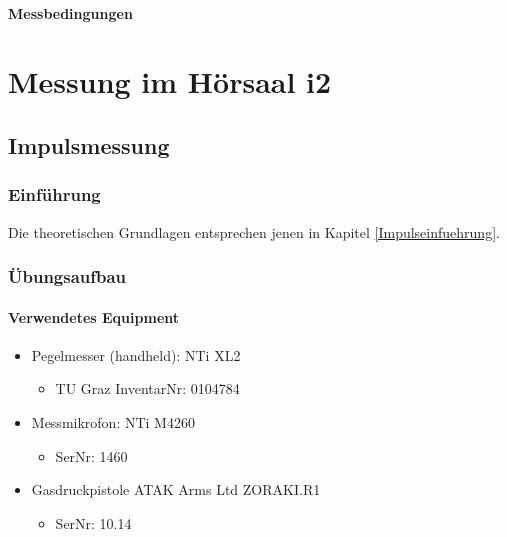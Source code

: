 \documentclass[11pt]{report}
\begin{document}
\paragraph{Messbedingungen}
\section{Messung im H\"orsaal i2}
\subsection{Impulsmessung}
\subsubsection{Einf\"uhrung}
Die theoretischen Grundlagen entsprechen jenen in Kapitel \ref{Impulseinfuehrung}.
\subsubsection{Übungsaufbau}
\paragraph{Verwendetes Equipment}
\begin{itemize}
\item Pegelmesser (handheld): NTi XL2
\begin{itemize}
\item TU Graz InventarNr: 0104784
\end{itemize}
\item Messmikrofon: NTi M4260
\begin{itemize}
\item SerNr: 1460
\end{itemize}
\item Gasdruckpistole ATAK Arms Ltd ZORAKI.R1
\begin{itemize}
\item SerNr: 10.14
\end{itemize}
\end{itemize}
\end{document}
